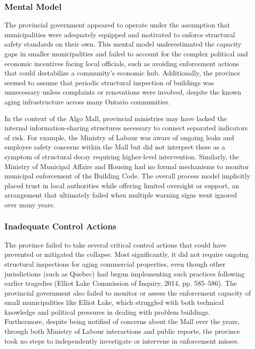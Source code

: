 \documentclass[12pt]{article}
\begin{document}
\subsubsection*{Mental Model}
The provincial government appeared to operate under the assumption that municipalities were adequately equipped and motivated to enforce structural safety standards on their own. This mental model underestimated the capacity gaps in smaller municipalities and failed to account for the complex political and economic incentives facing local officials, such as avoiding enforcement actions that could destabilize a community’s economic hub. Additionally, the province seemed to assume that periodic structural inspection of buildings was unnecessary unless complaints or renovations were involved, despite the known aging infrastructure across many Ontario communities.

In the context of the Algo Mall, provincial ministries may have lacked the internal information-sharing structures necessary to connect separated indicators of risk. For example, the Ministry of Labour was aware of ongoing leaks and employee safety concerns within the Mall but did not interpret these as a symptom of structural decay requiring higher-level intervention. Similarly, the Ministry of Municipal Affairs and Housing had no formal mechanisms to monitor municipal enforcement of the Building Code. The overall process model implicitly placed trust in local authorities while offering limited oversight or support, an arrangement that ultimately failed when multiple warning signs went ignored over many years.

\subsubsection*{Inadequate Control Actions}
The province failed to take several critical control actions that could have prevented or mitigated the collapse. Most significantly, it did not require ongoing structural inspections for aging commercial properties, even though other jurisdictions (such as Quebec) had begun implementing such practices following earlier tragedies (Elliot Lake Commission of Inquiry, 2014, pp. 585–586). The provincial government also failed to monitor or assess the enforcement capacity of small municipalities like Elliot Lake, which struggled with both technical knowledge and political pressures in dealing with problem buildings. Furthermore, despite being notified of concerns about the Mall over the years, through both Ministry of Labour interactions and public reports, the province took no steps to independently investigate or intervene in enforcement misses.
\end{document}
